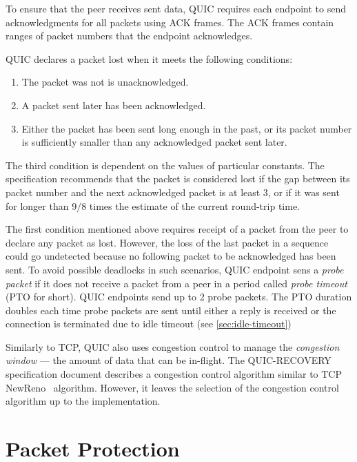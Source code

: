 To ensure that the peer receives sent data, QUIC requires each endpoint to send acknowledgments for
all packets using ACK frames. The ACK frames contain ranges of packet numbers that the endpoint
acknowledges.

QUIC declares a packet lost when it meets the following conditions:

\begin{enumerate}

  \item The packet was not is unacknowledged.

  \item A packet sent later has been acknowledged.

  \item Either the packet has been sent long enough in the past, or its packet number is
sufficiently smaller than any acknowledged packet sent later.

\end{enumerate}

The third condition is dependent on the values of particular constants. The specification recommends
that the packet is considered lost if the gap between its packet number and the next acknowledged
packet is at least 3, or if it was sent for longer than $9/8$ times the estimate of the current
round-trip time.

The first condition mentioned above requires receipt of a packet from the peer to declare any packet
as lost. However, the loss of the last packet in a sequence could go undetected because no following
packet to be acknowledged has been sent. To avoid possible deadlocks in such scenarios, QUIC
endpoint sens a \textit{probe packet} if it does not receive a packet from a peer in a period called
\textit{probe timeout} (PTO for short). QUIC endpoints send up to 2 probe packets. The PTO duration
doubles each time probe packets are sent until either a reply is received or the connection is
terminated due to idle timeout (see \autoref{sec:idle-timeout})

Similarly to TCP, QUIC also uses congestion control to manage the \textit{congestion window} --- the
amount of data that can be in-flight. The QUIC-RECOVERY specification document describes a
congestion control algorithm similar to TCP NewReno~\cite{rfc6582} algorithm. However, it leaves the
selection of the congestion control algorithm up to the implementation.

\section{Packet Protection}

